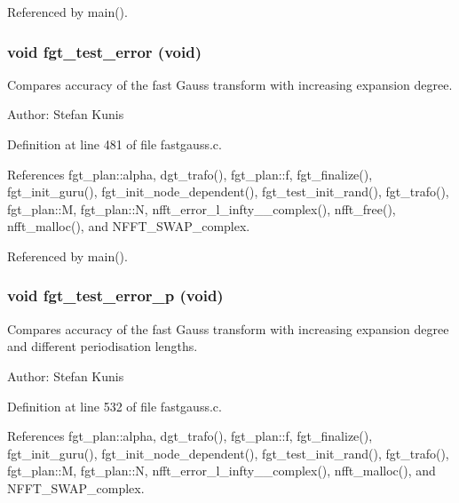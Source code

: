 Referenced by main().\hypertarget{group__applications__fastgauss_gab0a7e29242524d33269448fc4612946}{
\subsubsection{\setlength{\rightskip}{0pt plus 5cm}void fgt\_\-test\_\-error (void)}}
\label{group__applications__fastgauss_gab0a7e29242524d33269448fc4612946}


Compares accuracy of the fast Gauss transform with increasing expansion degree. 

\begin{Desc}
\item[Author:]Stefan Kunis \end{Desc}


Definition at line 481 of file fastgauss.c.

References fgt\_\-plan::alpha, dgt\_\-trafo(), fgt\_\-plan::f, fgt\_\-finalize(), fgt\_\-init\_\-guru(), fgt\_\-init\_\-node\_\-dependent(), fgt\_\-test\_\-init\_\-rand(), fgt\_\-trafo(), fgt\_\-plan::M, fgt\_\-plan::N, nfft\_\-error\_\-l\_\-infty\_\_\-complex(), nfft\_\-free(), nfft\_\-malloc(), and NFFT\_\-SWAP\_\-complex.

Referenced by main().\hypertarget{group__applications__fastgauss_gb68ea529a033a478a391243d8dacf61b}{
\subsubsection{\setlength{\rightskip}{0pt plus 5cm}void fgt\_\-test\_\-error\_\-p (void)}}
\label{group__applications__fastgauss_gb68ea529a033a478a391243d8dacf61b}


Compares accuracy of the fast Gauss transform with increasing expansion degree and different periodisation lengths. 

\begin{Desc}
\item[Author:]Stefan Kunis \end{Desc}


Definition at line 532 of file fastgauss.c.

References fgt\_\-plan::alpha, dgt\_\-trafo(), fgt\_\-plan::f, fgt\_\-finalize(), fgt\_\-init\_\-guru(), fgt\_\-init\_\-node\_\-dependent(), fgt\_\-test\_\-init\_\-rand(), fgt\_\-trafo(), fgt\_\-plan::M, fgt\_\-plan::N, nfft\_\-error\_\-l\_\-infty\_\_\-complex(), nfft\_\-malloc(), and NFFT\_\-SWAP\_\-complex.

